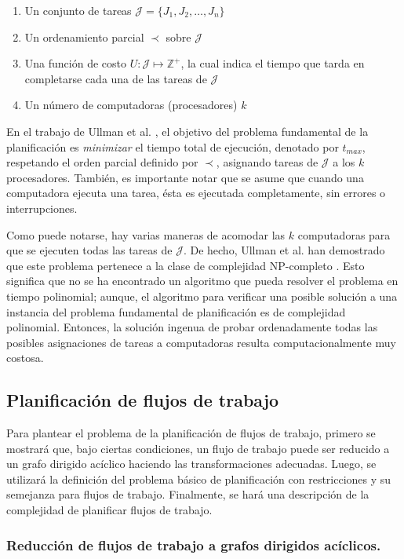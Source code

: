 \begin{enumerate}
\item Un conjunto de tareas $\mathcal{J} = \{ J_1, J_2, \dots, J_n \}$
\item Un ordenamiento parcial $\prec$ sobre $\mathcal{J}$
\item Una función de costo $U: \mathcal{J} \mapsto \mathbb{Z}^{+}$, la cual indica el tiempo que tarda en completarse cada una de las tareas de $\mathcal{J}$
\item Un número de computadoras (procesadores) $k$
\end{enumerate}

En el trabajo de Ullman et al. \cite{ullman1975np}, el objetivo del problema fundamental de la planificación es \emph{minimizar} el tiempo total de ejecución, denotado por $t_{max}$, respetando el orden parcial definido por $\prec$, asignando tareas de $\mathcal{J}$ a los $k$ procesadores. También, es importante notar que se asume que cuando una computadora ejecuta una tarea, ésta es ejecutada completamente, sin errores o interrupciones.

Como puede notarse, hay varias maneras de acomodar las $k$ computadoras para que se ejecuten todas las tareas de $\mathcal{J}$. De hecho, Ullman et al. han demostrado que este problema pertenece a la clase de complejidad NP-completo \cite{ullman1975np}. Esto significa que no se ha encontrado un algoritmo que pueda resolver el problema en tiempo polinomial; aunque, el algoritmo para verificar una posible solución a una instancia del problema fundamental de planificación es de complejidad polinomial. Entonces, la solución ingenua de probar ordenadamente todas las posibles asignaciones de tareas a computadoras resulta computacionalmente muy costosa.


\subsection{Planificación de flujos de trabajo}

Para plantear el problema de la planificación de flujos de trabajo, primero se mostrará que, bajo ciertas condiciones, un flujo de trabajo puede ser reducido a un grafo dirigido acíclico haciendo las transformaciones adecuadas. Luego, se utilizará la definición del problema básico de planificación con restricciones y su semejanza para flujos de trabajo. Finalmente, se hará una descripción de la complejidad de planificar flujos de trabajo.


\subsubsection{Reducción de flujos de trabajo a grafos dirigidos acíclicos.}

